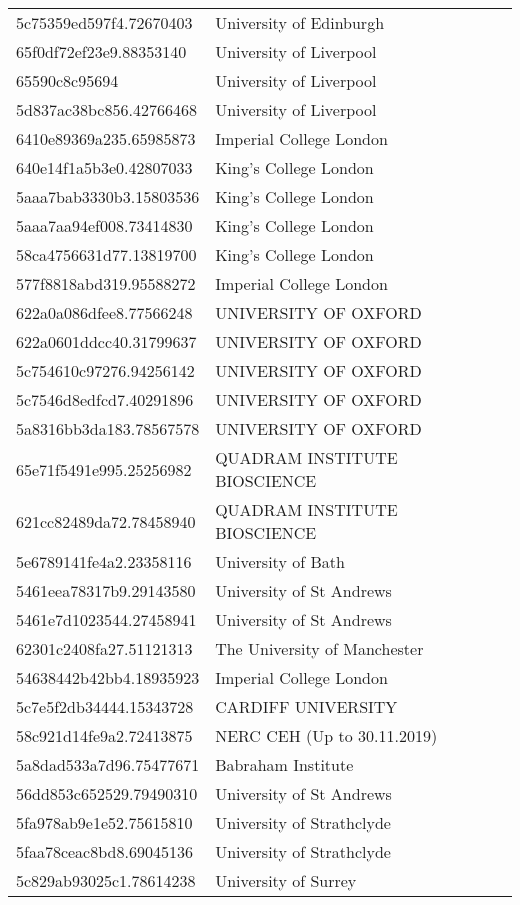\begin{tabular}{ll}
5c75359ed597f4.72670403 & University of Edinburgh \\
65f0df72ef23e9.88353140 & University of Liverpool \\
65590c8c95694 & University of Liverpool \\
5d837ac38bc856.42766468 & University of Liverpool \\
6410e89369a235.65985873 & Imperial College London \\
640e14f1a5b3e0.42807033 & King's College London \\
5aaa7bab3330b3.15803536 & King's College London \\
5aaa7aa94ef008.73414830 & King's College London \\
58ca4756631d77.13819700 & King's College London \\
577f8818abd319.95588272 & Imperial College London \\
622a0a086dfee8.77566248 & UNIVERSITY OF OXFORD \\
622a0601ddcc40.31799637 & UNIVERSITY OF OXFORD \\
5c754610c97276.94256142 & UNIVERSITY OF OXFORD \\
5c7546d8edfcd7.40291896 & UNIVERSITY OF OXFORD \\
5a8316bb3da183.78567578 & UNIVERSITY OF OXFORD \\
65e71f5491e995.25256982 & QUADRAM INSTITUTE BIOSCIENCE \\
621cc82489da72.78458940 & QUADRAM INSTITUTE BIOSCIENCE \\
5e6789141fe4a2.23358116 & University of Bath \\
5461eea78317b9.29143580 & University of St Andrews \\
5461e7d1023544.27458941 & University of St Andrews \\
62301c2408fa27.51121313 & The University of Manchester \\
54638442b42bb4.18935923 & Imperial College London \\
5c7e5f2db34444.15343728 & CARDIFF UNIVERSITY \\
58c921d14fe9a2.72413875 & NERC CEH (Up to 30.11.2019) \\
5a8dad533a7d96.75477671 & Babraham Institute \\
56dd853c652529.79490310 & University of St Andrews \\
5fa978ab9e1e52.75615810 & University of Strathclyde \\
5faa78ceac8bd8.69045136 & University of Strathclyde \\
5c829ab93025c1.78614238 & University of Surrey \\

\end{tabular}
